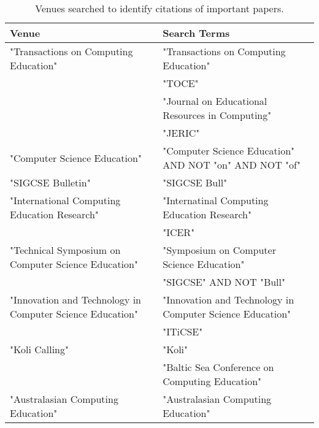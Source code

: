 \begin{table*}[t]
\begin{tabular}{ll}
Venue & Search Terms\\\hline
"Transactions on Computing Education" & "Transactions on Computing Education"\\
& "TOCE"\\
& "Journal on Educational Resources in Computing"\\
& "JERIC"\\
"Computer Science Education" & "Computer Science Education" AND NOT "on" AND NOT "of"\\
"SIGCSE Bulletin" & "SIGCSE Bull"\\
"International Computing Education Research" & "Internatinal Computing Education Research"\\
& "ICER"\\
"Technical Symposium on Computer Science Education" & "Symposium on Computer Science Education"\\
& "SIGCSE" AND NOT "Bull"\\
"Innovation and Technology in Computer Science Education" & "Innovation and Technology in Computer Science Education"\\
& "ITiCSE"\\
"Koli Calling" & "Koli"\\
& "Baltic Sea Conference on Computing Education"\\
"Australasian Computing Education" & "Australasian Computing Education"
\end{tabular}
\caption{Venues searched to identify citations of important papers.}
\end{table*}